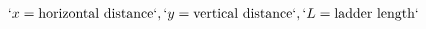 \documentclass[preview]{standalone}
\begin{document}
\begin{align*}
`x = \text{horizontal distance}`, `y = \text{vertical distance}`, `L = \text{ladder length}`
\end{align*}
\end{document}
